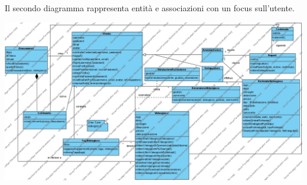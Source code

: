Il secondo diagramma rappresenta entità e associazioni con un focus sull’utente.
\begin{center}
\includegraphics[width=\textwidth,height=\textheight,keepaspectratio]{Figure/ClassDiagrams/FocusUtente.jpg}
\end{center}

